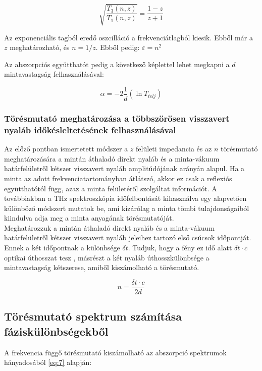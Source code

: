 \documentclass[a4paper,12pt]{article}
\numberwithin{equation}{section}
\begin{document}
\begin{equation}\label{eq:4}
\sqrt{\frac{T_3(n, z)}{T_1(n, z)}}=\frac{1-z}{z+1}
\end{equation}

Az exponenciális tagból eredő oszcilláció a frekvenciátlagból kiesik. Ebből már a $z$ meghatározható, és $n = 1/z$. Ebből pedig: $\varepsilon = n^2$


Az abszorpciós együtthatót pedig a következő képlettel lehet megkapni a $d$ mintavastagság felhasználásával:

\begin{equation}\label{eq:5}
\alpha=-2\frac{1}{d}(\ln T_{telj})
\end{equation}

\subsubsection{Törésmutató meghatározása a többszörösen visszavert nyaláb  időkésleltetésének felhasználásával \label{sec:mas}}
Az előző pontban ismertetett módszer a $z$ felületi impedancia és az $n$ törésmutató meghatározására a mintán áthaladó direkt nyaláb és a minta-vákuum határfelületről kétszer visszavert nyaláb amplitúdójának arányán alapul. Ha a minta az adott frekvenciatartományban átlátszó, akkor ez csak a reflexiós együtthatótól függ, azaz a minta felületéről szolgáltat információt. A továbbiakban a THz spektroszkópia időfelbontását kihasználva egy alapvetően különböző módszert mutatok be, ami kizárólag a minta tömbi tulajdonságaiból kiindulva adja meg a minta anyagának törésmutatóját.\\

Meghatározzuk a mintán áthaladó direkt nyaláb és a minta-vákuum határfelületről kétszer visszavert  nyaláb jeleihez tartozó első csúcsok időpontját. Ennek a két időpontnak a különbsége $\delta t$. Tudjuk, hogy a fény ez idő alatt $\delta t \cdot c$ optikai úthosszat tesz , másrészt a két nyaláb úthosszkülönbsége a mintavastagság kétszerese, amiből kiszámolható a törésmutató.

\begin{equation}\label{eq:6}
    n = \frac{\delta t \cdot c}{2 d}
\end{equation}

\subsection{Törésmutató spektrum számítása fáziskülönbségekből}

A frekvencia függő törésmutató kiszámolható az abszorpció spektrumok hányadosából \ref{eq:7} alapján:
\end{document}
